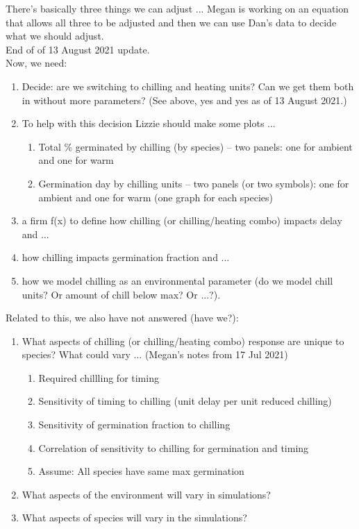 \documentclass[11pt,letter]{article}
\begin{document}
There's basically three things we can adjust ... Megan is working on an equation that allows all three to be adjusted and then we can use Dan's data to decide what we should adjust.\\

End of of 13 August 2021 update.\\

Now, we need:
\begin{enumerate}
\item Decide: are we switching to chilling and heating units? Can we get them both in without more parameters? (See above, yes and yes as of 13 August 2021.)
\item To help with this decision Lizzie should make some plots ... 
\begin{enumerate}
\item Total \% germinated by chilling (by species)  -- two panels: one for ambient and one for warm
\item Germination day by chilling units -- two panels (or two symbols): one for ambient and one for warm (one graph for each species)
\end{enumerate}
\item a firm f(x) to define how chilling (or chilling/heating combo) impacts delay and ...
\item how chilling impacts germination fraction and ...
\item how we model chilling as an environmental parameter (do we model chill units? Or amount of chill below max? Or ...?). 
\end{enumerate}

Related to this, we also have not answered (have we?):
\begin{enumerate}
\item What aspects of chilling (or chilling/heating combo) response are unique to species? What could vary ... (Megan's notes from 17 Jul 2021)
\begin{enumerate}
\item Required chillling for timing
\item Sensitivity of timing to chilling (unit delay per unit reduced chilling)
\item Sensitivity of germination fraction to chilling
\item Correlation of sensitivity to chilling for germination and timing
\item Assume: All species have same max germination
\end{enumerate}
\item What aspects of the environment will vary in simulations?
\item What aspects of species will vary in the simulations?
\end{enumerate}
\end{document}
